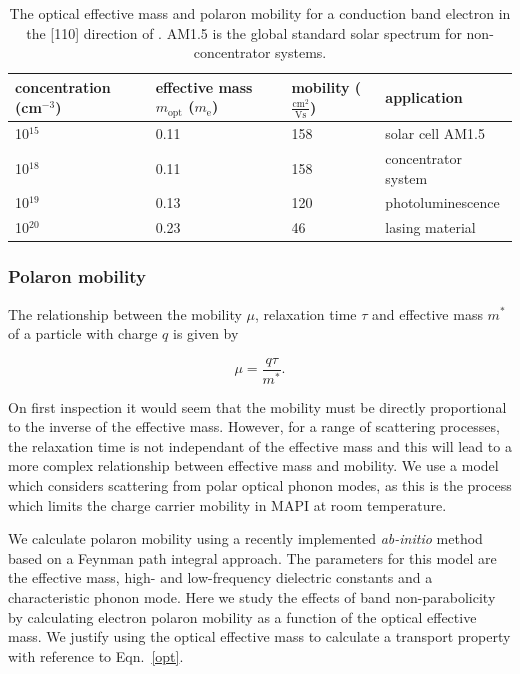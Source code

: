 \begin{table} \centering
\caption[Concentration dependence of electron effective mass and polaron mobility]{\label{masstable} The optical effective mass and polaron mobility for a conduction band electron in the [110] direction of . AM1.5 is the global standard solar spectrum for non-concentrator systems.}
\begin{tabular}{p{3cm}p{3cm}p{3cm}p{5cm}}
\toprule
concentration (cm$^{-3}$) & effective mass $m_\text{opt}$ ($m_\text{e}$) & mobility ($\frac{\text{cm}^2}{\text{Vs}}$) & application \\
\midrule
10$^{15}$ & 0.11 & 158 & solar cell AM1.5\\
10$^{18}$ & 0.11 & 158 & concentrator system \\
10$^{19}$ & 0.13 & 120 & photoluminescence\\
10$^{20}$ & 0.23 & 46 & lasing material \\
\bottomrule
\end{tabular}
\end{table}


\subsubsection{Polaron mobility}

The relationship between the mobility $\mu$, relaxation time $\tau$ and effective mass $m^*$ of a particle with charge $q$ is given by

\begin{equation}
\mu = \frac{q\tau}{m^*}.
\end{equation}

On first inspection it would seem that the mobility must be directly proportional to the inverse of the effective mass. 
However, for a range of scattering processes, the relaxation time is not independant of the effective mass and this will lead to a more complex relationship between effective mass and mobility.
We use a model which considers scattering from polar optical phonon modes,
as this is the process which limits the charge carrier mobility in MAPI at room temperature.\autocite{Wright2016}

We calculate polaron mobility using a recently implemented \textit{ab-initio} method based on a Feynman path integral approach.\autocite{Frost2017b}
The parameters for this model are the effective mass, high- and low-frequency dielectric constants and a characteristic phonon mode.
Here we study the effects of band non-parabolicity by calculating electron polaron mobility as a function of the optical effective mass. 
We justify using the optical effective mass to calculate a transport property with reference to Eqn.\ \ref{opt}.

